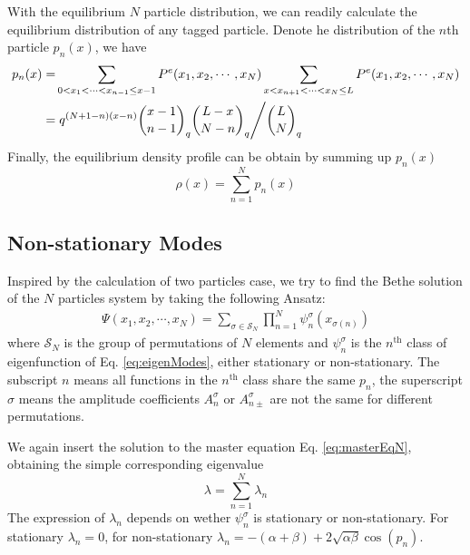 \documentclass[12pt,a4paper]{article}
\begin{document}
With the equilibrium $N$ particle distribution, we can readily calculate the
equilibrium distribution of any tagged particle. Denote he distribution of the
$n$th particle $p_n(x)$, we have
\begin{equation}
    \begin{aligned}
        \label{eq:pdfTaggedParticle}
        p_n(x) = & \sum_{0<x_1<\cdots<x_{n-1}\le x-1}P^e(x_1, x_2, \cdots, x_N)
        \sum_{x<x_{n+1}<\cdots<x_{N}\le L}P^e(x_1, x_2, \cdots, x_N) \\
        = & \left. q^{(N+1-n)(x-n)} \binom{x-1}{n-1}_q\binom{L-x}{N-n}_q 
            \middle/  \binom{L}{N}_q \right.
    \end{aligned}
\end{equation}
Finally, the equilibrium density profile can be obtain by summing up $p_n(x)$
\begin{equation}
    \label{eq:densityProfile}
    \rho(x) = \sum_{n=1}^N p_n(x) 
\end{equation}


\subsection{Non-stationary Modes}
\label{sub:non_stationary_modes}

Inspired by the calculation of two particles case, we try to find the Bethe
solution of the $N$ particles system by taking the following Ansatz: 
\begin{equation}
    \label{eq:nonstationaryModesN}
    \begin{aligned}
        \Psi(x_1, x_2, \cdots, x_N) = \sum_{\sigma\in \mathcal{S}_N}
        \prod_{n=1}^N \psi_n^{\sigma}(x_{\sigma(n)})
    \end{aligned}
\end{equation}
where $\mathcal{S}_N$ is the group of permutations of $N$ elements and
$\psi_n^{\sigma}$ is the $n^{\text{th}}$ class of eigenfunction of Eq.
\eqref{eq:eigenModes}, either stationary or non-stationary. The subscript $n$
means all functions in the $n^{\text{th}}$ class share the same $p_n$, the
superscript $\sigma$ means the amplitude coefficients $A_n^{\sigma}$ or
$A_{n\pm}^{\sigma}$ are not the same for different permutations.

We again insert the solution to the master equation Eq. \eqref{eq:masterEqN},
obtaining the simple corresponding eigenvalue 
\begin{equation}
    \label{eq:eigenvaluesN}
    \lambda = \sum_{n=1}^N \lambda_n
\end{equation}
The expression of $\lambda_n$ depends on wether $\psi_n^{\sigma}$ is stationary
or non-stationary. For stationary $\lambda_n=0$, for non-stationary $\lambda_n=
-(\alpha+\beta)+2\sqrt{\alpha\beta}\cos(p_n)$.
\end{document}

